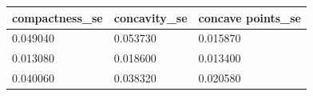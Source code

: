 \begin{tabular}{p{2.5cm}p{2cm}p{2.5cm}}
\toprule
compactness\_se & concavity\_se & concave points\_se \\
\midrule
0.049040 & 0.053730 & 0.015870 \\
0.013080 & 0.018600 & 0.013400 \\
0.040060 & 0.038320 & 0.020580 \\
\bottomrule
\end{tabular} 